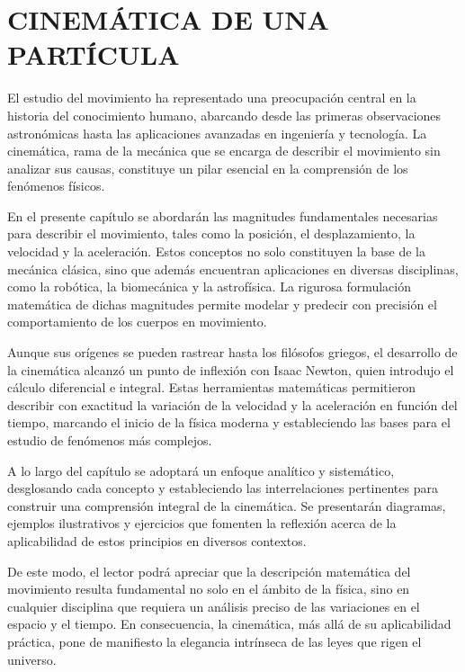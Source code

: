 \chapter[Cinemática de una partícula]{CINEMÁTICA DE UNA PARTÍCULA}\label{chap:cap1}
\startcontents
\printchaptertableofcontents

El estudio del movimiento ha representado una preocupación central en la historia del conocimiento humano, abarcando desde las primeras observaciones astronómicas hasta las aplicaciones avanzadas en ingeniería y tecnología. La cinemática, rama de la mecánica que se encarga de describir el movimiento sin analizar sus causas, constituye un pilar esencial en la comprensión de los fenómenos físicos.

En el presente capítulo se abordarán las magnitudes fundamentales necesarias para describir el movimiento, tales como la posición, el desplazamiento, la velocidad y la aceleración. Estos conceptos no solo constituyen la base de la mecánica clásica, sino que además encuentran aplicaciones en diversas disciplinas, como la robótica, la biomecánica y la astrofísica. La rigurosa formulación matemática de dichas magnitudes permite modelar y predecir con precisión el comportamiento de los cuerpos en movimiento.

Aunque sus orígenes se pueden rastrear hasta los filósofos griegos, el desarrollo de la cinemática alcanzó un punto de inflexión con Isaac Newton, quien introdujo el cálculo diferencial e integral. Estas herramientas matemáticas permitieron describir con exactitud la variación de la velocidad y la aceleración en función del tiempo, marcando el inicio de la física moderna y estableciendo las bases para el estudio de fenómenos más complejos.

A lo largo del capítulo se adoptará un enfoque analítico y sistemático, desglosando cada concepto y estableciendo las interrelaciones pertinentes para construir una comprensión integral de la cinemática. Se presentarán diagramas, ejemplos ilustrativos y ejercicios que fomenten la reflexión acerca de la aplicabilidad de estos principios en diversos contextos.

De este modo, el lector podrá apreciar que la descripción matemática del movimiento resulta fundamental no solo en el ámbito de la física, sino en cualquier disciplina que requiera un análisis preciso de las variaciones en el espacio y el tiempo. En consecuencia, la cinemática, más allá de su aplicabilidad práctica, pone de manifiesto la elegancia intrínseca de las leyes que rigen el universo.

